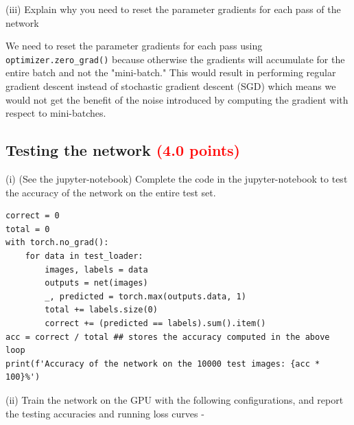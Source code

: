 \documentclass[answers]{exam}
\newcommand{\mypoints}[1]{\textcolor{red}{(#1 points)}}
\begin{document}
(iii) Explain why you need to reset the parameter gradients for each pass of the network
\begin{solution}
We need to reset the parameter gradients for each pass using \texttt{optimizer.zero\_grad()} because otherwise the gradients will accumulate for the entire batch and not the "mini-batch." 
This would result in performing regular gradient descent instead of stochastic gradient descent (SGD) which means we would not get the benefit of the noise introduced by computing the gradient with respect to 
mini-batches.
\end{solution}
\subsection{Testing the network \mypoints{4.0}}

(i) (See the jupyter-notebook) Complete the code in the jupyter-notebook to test the accuracy of the network on the entire test set. 
\begin{solution}
\begin{verbatim}
correct = 0
total = 0
with torch.no_grad():
    for data in test_loader:
        images, labels = data
        outputs = net(images)
        _, predicted = torch.max(outputs.data, 1)
        total += labels.size(0)
        correct += (predicted == labels).sum().item()
acc = correct / total ## stores the accuracy computed in the above loop 
print(f'Accuracy of the network on the 10000 test images: {acc * 100}%')
\end{verbatim}
\end{solution}
(ii) Train the network on the GPU with the following configurations, and report the testing accuracies and running loss curves -
\end{document}
